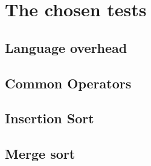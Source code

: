 \section{The chosen tests}

\subsection{Language overhead}

\subsection{Common Operators}

\subsection{Insertion Sort}

\subsection{Merge sort}